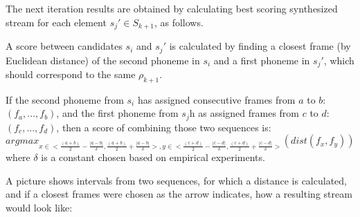 \documentclass[12pt,a4paper,english]{article}
\begin{document}
The next iteration results are obtained by calculating best scoring synthesized stream for each element $s_j' \in S_{k+1}$, as follows. \newline

A score between candidates $s_i$ and $s_j'$ is calculated by finding a closest frame (by Euclidean distance) of the second phoneme in $s_i$ and a first phoneme in $s_j'$, which should correspond to the same $\rho_{k+1}$. \newline

If the second phoneme from $s_i$ has assigned consecutive frames from $a$ to $b$: $(f_a, ..., f_b)$, \newline
and the first phoneme from $s_j$h as assigned frames from $c$ to $d$: $(f_c, ..., f_d)$, \newline
then a score of combining those two sequences is:
\begin{equation}
    argmax_{x \in <\frac {(a + b)} 2 - \frac {|a - b|} \delta, \frac {(a + b)} 2 + \frac {|a - b|} \delta>, y \in <\frac {(c + d)} 2 - \frac {|c - d|} \delta, \frac {(c + d)} 2 + \frac {|c - d|} \delta>}(dist(f_x, f_y))
\end{equation}
where $\delta$ is a constant chosen based on empirical experiments. \newline

A picture shows intervals from two sequences, for which a distance is calculated, and if a closest frames were chosen as the arrow indicates, how a resulting stream would look like:
\end{document}
